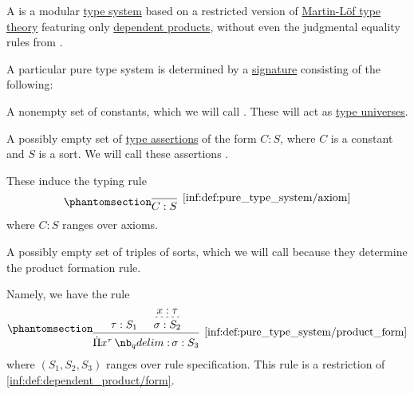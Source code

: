 \begin{definition}\label{def:pure_type_system}
  A  is a modular \hyperref[def:abstract_type_system]{type system} based on a restricted version of \hyperref[def:mltt]{Martin-L\"of type theory} featuring only \hyperref[def:dependent_product]{dependent products}, without even the judgmental equality rules from .

  A particular pure type system is determined by a \hyperref[con:reserved_symbol]{signature} consisting of the following:
  \begin{thmenum}
     A nonempty set of constants, which we will call . These will act as \hyperref[con:type_universe]{type universes}.

     A possibly empty set of \hyperref[def:type_assertion]{type assertions} of the form \( C: S \), where \( C \) is a constant and \( S \) is a sort. We will call these assertions .

    These induce the typing rule
    \begin{equation*}\taglabel[\logic{Ax}]{inf:def:pure_type_system/axiom}
      \begin{prooftree}
        \infer0[\ref{inf:def:pure_type_system/axiom}]{ C: S },
      \end{prooftree}
    \end{equation*}
    where \( C: S \) ranges over axioms.

     A possibly empty set of triples of sorts, which we will call  because they determine the product formation rule.

    Namely, we have the rule
    \begin{equation*}\taglabel[\ensuremath{ \Pi_{\logic{form}}^{\logic{PTS}} }]{inf:def:pure_type_system/product_form}
      \begin{prooftree}
        \hypo{ \tau: S_1 }

        \hypo{ x: \tau }
        \infer[dashed]1{ \sigma: S_2 }

        \infer2[\ref{inf:def:pure_type_system/product_form}]{ \qprod {x^\tau} \sigma: S_3 }
      \end{prooftree}
    \end{equation*}
    where \( (S_1, S_2, S_3) \) ranges over rule specification. This rule is a restriction of \ref{inf:def:dependent_product/form}.


\end{thmenum}
\end{definition}
